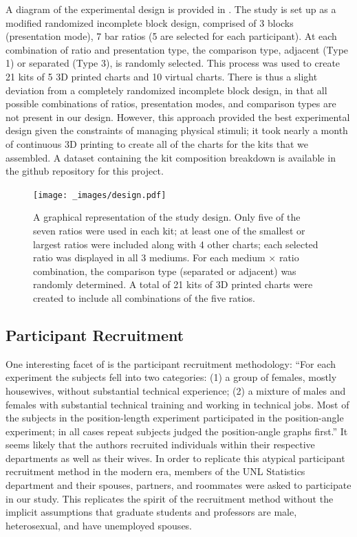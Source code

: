 \documentclass[letterpaper,inpress,dvipsnames]{jdsart}
\begin{document}
A diagram of the experimental design is provided in . The study is set up as a modified randomized incomplete block design, comprised of 3 blocks (presentation mode), 7 bar ratios (5 are selected for each participant). At each combination of ratio and presentation type, the comparison type, adjacent (Type 1) or separated (Type 3), is randomly selected. This process was used to create 21 kits of 5 3D printed charts and 10 virtual charts. There is thus a slight deviation from a completely randomized incomplete block design, in that all possible combinations of ratios, presentation modes, and comparison types are not present in our design. However, this approach provided the best experimental design given the constraints of managing physical stimuli; it took nearly a month of continuous 3D printing to create all of the charts for the kits that we assembled. A dataset containing the kit composition breakdown is available in the github repository for this project.

\begin{figure}
\centering
\texttt{[image: \_images/design.pdf]}
\caption{\label{fig:studyDesign}A graphical representation of the study design. Only five of the seven ratios were used in each kit; at least one of the smallest or largest ratios were included along with 4 other charts; each selected ratio was displayed in all 3 mediums. For each medium \(\times\) ratio combination, the comparison type (separated or adjacent) was randomly determined. A total of 21 kits of 3D printed charts were created to include all combinations of the five ratios.}
\end{figure}

\hypertarget{participant-recruitment}{%
\subsection{Participant Recruitment}\label{participant-recruitment}}

One interesting facet of \citet{clevelandGraphical1984} is the participant recruitment methodology: ``For each experiment the subjects fell into two categories: (1) a group of females, mostly housewives, without substantial technical experience; (2) a mixture of males and females with substantial technical training and working in technical jobs.
Most of the subjects in the position-length experiment participated in the position-angle experiment; in all cases repeat subjects judged the position-angle graphs first.''
It seems likely that the authors recruited individuals within their respective departments as well as their wives.
In order to replicate this atypical participant recruitment method in the modern era, members of the UNL Statistics department and their spouses, partners, and roommates were asked to participate in our study.
This replicates the spirit of the recruitment method without the implicit assumptions that graduate students and professors are male, heterosexual, and have unemployed spouses.
\end{document}
